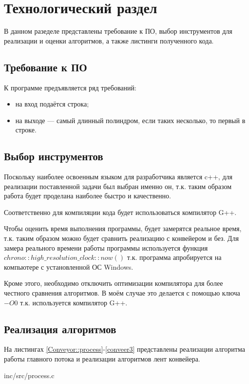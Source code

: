 \chapter{Технологический раздел}
В данном разеделе представлены требование к ПО, выбор инструментов для реализации и оценки алгоритмов, а также листинги полученного кода.

\section{Требование к ПО}

К программе предъявляется ряд требований:

\begin{itemize}
	\item на вход подаётся строка;
	\item на выходе — самый длинный полиндром, если таких несколько, то первый в строке.
\end{itemize}

\section{Выбор инструментов}
Поскольку наиболее освоенным языком для разработчика является c++, для реализации поставленной задачи был выбран именно он, т.к. таким образом работа будет проделана наиболее быстро и качественно.

Соответственно для компиляции кода будет использоваться компилятор G++.

Чтобы оценить время выполнения программы, будет замерятся реальное время, т.к. таким образом можно будет сравнить реализацию с конвейером и без. Для замера реального времени работы программы используется функция $chrono::high\_resolution\_clock::now()$ т.к. программа апробируется на компьютере с установленной ОС Windows. \cite{chrono()}

Кроме этого, необходимо отключить оптимизации компилятора для более честного сравнения алгоритмов. В моём случае это делается с помощью ключа $-O0$ т.к. используется компилятор G++. \cite{optimization}

\section{Реализация алгоритмов}
На листингах \ref{Conveyor::process}-\ref{conveer3} представлены реализации алгоритма работы главного потока и реализации алгоритмов лент конвейера.

\begin{lstinputlisting}[
	caption={Реализация алгоритма работы главного потока},
	label={Conveyor::process},
	style={c},
	]{inc/src/process.c}
\end{lstinputlisting}

